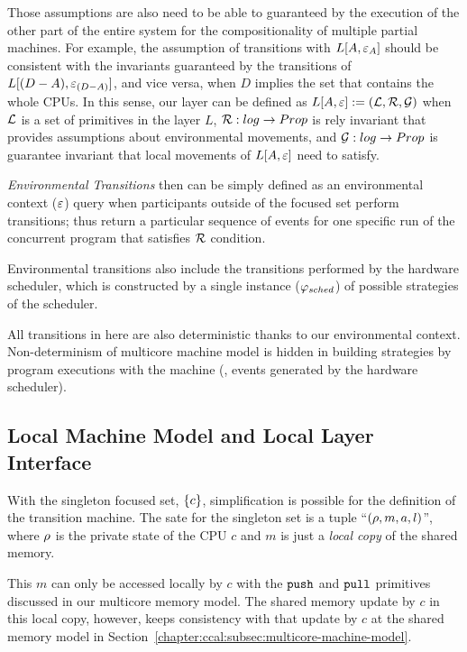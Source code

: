 Those assumptions are also need to be able to guaranteed by the execution of the other part of the entire system for 
the compositionality of multiple partial machines.
For example, the assumption of transitions with $L[A, {\varepsilon}_{A}]$ should be consistent with the invariants guaranteed by the transitions of $L[(D - A), {\varepsilon}_{(D-A)}]$, and vice versa, when $D$ implies the set that contains the whole CPUs.
In this sense, our layer can be defined as
$L[A, {\varepsilon}] := (\mathcal{L}, \mathcal{R},\mathcal{G})$ when $\mathcal{L}$ is a set of primitives in the layer $L$,
$\mathcal{R} : log \rightarrow Prop$ is  rely invariant that provides assumptions about  environmental movements,
and $\mathcal{G}: log \rightarrow Prop$ is guarantee invariant that local movements of $L[A, {\varepsilon}]$ need to satisfy.

\emph{Environmental Transitions} then can be simply defined as 
an environmental context (${\varepsilon}$) query when participants outside of the focused set perform transitions;
thus return a particular sequence of events for one specific run of the concurrent program 
that satisfies $\mathcal{R}$ condition.

Environmental transitions also include the transitions performed by 
the hardware scheduler, which is constructed by 
a single instance ($\varphi_{sched}$) of possible strategies of the scheduler.

All transitions in here are also deterministic thanks to our environmental context.
Non-determinism of multicore machine model is hidden in building strategies by
program executions with the machine (\eg, events generated by the hardware scheduler).

\subsection{Local Machine Model and Local Layer Interface}
\label{chapter:ccal:subsec:local-layer-interface}

With the singleton focused set, $\{c\}$, 
simplification is possible for the definition of the transition machine.
The sate for the singleton set is a tuple ``$(\rho, m, a, l)$'',
where $\rho$ is the private state of the CPU $c$
and $m$ is just a \emph{local copy} of the shared memory.


This $m$ can only be accessed locally by $c$ with the ${\mathrm{\texttt{push}}}$ and ${\mathrm{\texttt{pull}}}$ primitives discussed in our multicore memory model. 
The shared  memory update by $c$ in this local copy, however, 
keeps consistency with 
that update by $c$ at the shared memory model in
Section~\ref{chapter:ccal:subsec:multicore-machine-model}.


